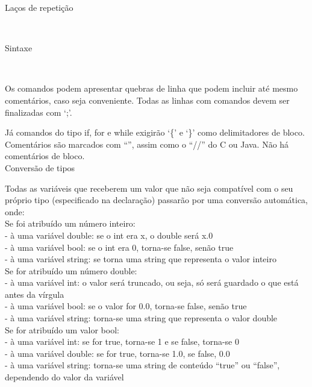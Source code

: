 \documentclass[12pt,a4paper]{article}
\begin{document}

\hypertarget{label5}{\Large{Laços de repetição}}\\[0.3cm]
\normalsize


\hypertarget{label6}{\Large{Sintaxe}}\\[0.3cm]
\normalsize

Os comandos podem apresentar quebras de linha que podem incluir até mesmo comentários, caso seja conveniente. Todas as linhas com comandos devem ser finalizadas com `;'.

Já comandos do tipo if, for e while exigirão `\{' e `\}' como delimitadores de bloco.
Comentários são marcados com ``\-\-'', assim como o ``//'' do C ou Java. Não há comentários de bloco.\\

\hypertarget{label8}{\Large{Conversão de tipos}}\\[0.3cm]
\normalsize

Todas as variáveis que receberem um valor que não seja compatível com o seu próprio tipo (especificado na declaração) passarão por uma conversão automática, onde: \\

Se foi atribuído um número inteiro:\\
- à uma variável double: se o int era x, o double será x.0\\
- à uma variável bool: se o int era 0, torna-se false, senão true\\
- à uma variável string: se torna uma string que representa o valor inteiro\\[0.3cm]

Se for atribuído um número double:\\
- à uma variável int: o valor será truncado, ou seja, só será guardado o que está antes da vírgula\\
- à uma variável bool: se o valor for 0.0, torna-se false, senão true\\
- à uma variável string: torna-se uma string que representa o valor double\\[0.3cm]

Se for atribuído um valor bool:\\
- à uma variável int: se for true, torna-se 1 e se false, torna-se 0\\
- à uma variável double: se for true, torna-se 1.0, se false, 0.0\\
- à uma variável string: torna-se uma string de conteúdo ``true'' ou ``false'', dependendo do valor da variável\\[0.3cm]
\end{document}
